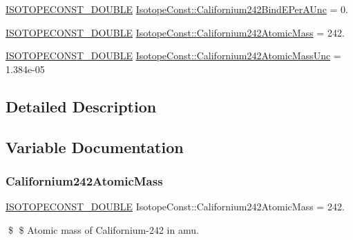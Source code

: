 \begin{DoxyCompactItemize}
\item 
\mbox{\hyperlink{group___isotope_const-_macros_ga8f45a7272ce02c0b4c65c44636ed719a}{I\+S\+O\+T\+O\+P\+E\+C\+O\+N\+S\+T\+\_\+\+D\+O\+U\+B\+LE}} \mbox{\hyperlink{group___isotope_const-_californium-_cf242_ga8b08b17fa1fd7680ce5a76aad7aa1903}{Isotope\+Const\+::\+Californium242\+Bind\+E\+Per\+A\+Unc}} = 0.
\item 
\mbox{\hyperlink{group___isotope_const-_macros_ga8f45a7272ce02c0b4c65c44636ed719a}{I\+S\+O\+T\+O\+P\+E\+C\+O\+N\+S\+T\+\_\+\+D\+O\+U\+B\+LE}} \mbox{\hyperlink{group___isotope_const-_californium-_cf242_ga50b93acbf98a931b72132c2214a2434c}{Isotope\+Const\+::\+Californium242\+Atomic\+Mass}} = 242.
\item 
\mbox{\hyperlink{group___isotope_const-_macros_ga8f45a7272ce02c0b4c65c44636ed719a}{I\+S\+O\+T\+O\+P\+E\+C\+O\+N\+S\+T\+\_\+\+D\+O\+U\+B\+LE}} \mbox{\hyperlink{group___isotope_const-_californium-_cf242_ga46883ad3cfb80dde7030ed4e3af87e1b}{Isotope\+Const\+::\+Californium242\+Atomic\+Mass\+Unc}} = 1.\+384e-\/05
\end{DoxyCompactItemize}


\subsection{Detailed Description}


\subsection{Variable Documentation}
\mbox{\label{group___isotope_const-_californium-_cf242_ga50b93acbf98a931b72132c2214a2434c}} 
\subsubsection{\texorpdfstring{Californium242\+Atomic\+Mass}{Californium242AtomicMass}}
{\footnotesize\ttfamily \mbox{\hyperlink{group___isotope_const-_macros_ga8f45a7272ce02c0b4c65c44636ed719a}{I\+S\+O\+T\+O\+P\+E\+C\+O\+N\+S\+T\+\_\+\+D\+O\+U\+B\+LE}} Isotope\+Const\+::\+Californium242\+Atomic\+Mass = 242.}

\$ \$ Atomic mass of Californium-\/242 in amu. \mbox{\label{group___isotope_const-_californium-_cf242_ga46883ad3cfb80dde7030ed4e3af87e1b}} 
